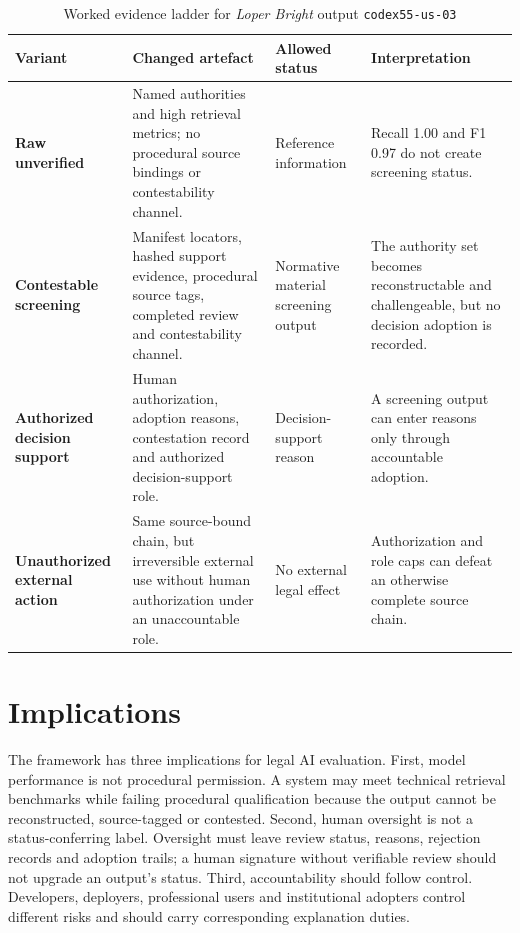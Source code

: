 \documentclass[12pt,a4paper]{article}
\begin{document}
\begin{table}[htbp]
\centering
\caption{Worked evidence ladder for \textit{Loper Bright} output \texttt{codex55-us-03}}
\label{tab:loper-bright-evidence-ladder}
\small
\renewcommand{\arraystretch}{1.12}
\begin{tabularx}{\textwidth}{>{\bfseries}p{3.1cm}p{3.6cm}p{3.0cm}Y}
\toprule
Variant & Changed artefact & Allowed status & Interpretation \\
\midrule
Raw unverified & Named authorities and high retrieval metrics; no procedural source bindings or contestability channel. & Reference information & Recall 1.00 and F1 0.97 do not create screening status. \\
Contestable screening & Manifest locators, hashed support evidence, procedural source tags, completed review and contestability channel. & Normative material screening output & The authority set becomes reconstructable and challengeable, but no decision adoption is recorded. \\
Authorized decision support & Human authorization, adoption reasons, contestation record and authorized decision-support role. & Decision-support reason & A screening output can enter reasons only through accountable adoption. \\
Unauthorized external action & Same source-bound chain, but irreversible external use without human authorization under an unaccountable role. & No external legal effect & Authorization and role caps can defeat an otherwise complete source chain. \\
\bottomrule
\end{tabularx}
\end{table}

\section{Implications}

The framework has three implications for legal AI evaluation. First, model performance is not procedural permission. A system may meet technical retrieval benchmarks while failing procedural qualification because the output cannot be reconstructed, source-tagged or contested. Second, human oversight is not a status-conferring label. Oversight must leave review status, reasons, rejection records and adoption trails; a human signature without verifiable review should not upgrade an output's status. Third, accountability should follow control. Developers, deployers, professional users and institutional adopters control different risks and should carry corresponding explanation duties.
\end{document}
